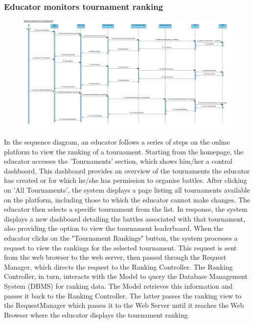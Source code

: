\subsubsection{Educator monitors tournament ranking}
\begin{figure}[H]
    \centering
    \includegraphics[width=1\textwidth]{SequenceDiagram/EducatorMonitorsTournamentRanking.png}
    \label{fig:enter-label}
\end{figure}
In the sequence diagram, an educator follows a series of steps on the online platform to view the ranking of a tournament. Starting from the homepage, the educator accesses the 'Tournaments' section, which shows him/her a control dashboard. This dashboard provides an overview of the tournaments the educator has created or for which he/she has permission to organise battles.
After clicking on 'All Tournaments', the system displays a page listing all tournaments available on the platform, including those to which the educator cannot make changes. The educator then selects a specific tournament from the list. In response, the system displays a new dashboard detailing the battles associated with that tournament, also providing the option to view the tournament leaderboard.
When the educator clicks on the "Tournament Rankings" button, the system processes a request to view the rankings for the selected tournament. This request is sent from the web browser to the web server, then passed through the Request Manager, which directs the request to the Ranking Controller.
The Ranking Controller, in turn, interacts with the Model to query the Database Management System (DBMS) for ranking data. The Model retrieves this information and passes it back to the Ranking Controller.  The latter passes the ranking view to the RequestManager which passes it to the Web Server until it reaches the Web Browser where the educator displays the tournament ranking.
